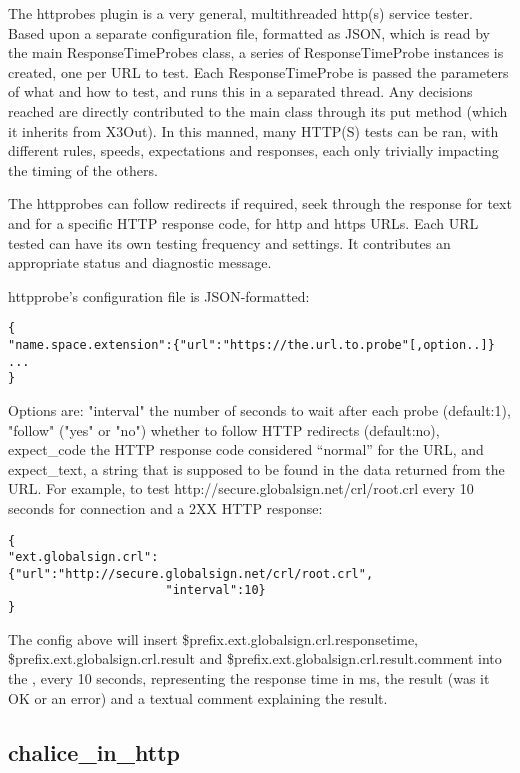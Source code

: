 The httprobes plugin is a very general, multithreaded http(s)
service tester.  Based upon a separate configuration file, formatted
as JSON, which is read by the main ResponseTimeProbes class, a series
of ResponseTimeProbe instances is created, one per URL to test. Each
ResponseTimeProbe is passed the parameters of what and how to test,
and runs this in a separated thread.  Any decisions reached are directly
contributed to the main class through its put method (which it inherits
from X3Out). In this manned, many HTTP(S) tests can be ran, with different
rules, speeds, expectations and responses, each only trivially impacting
the timing of the others.

The httpprobes can follow redirects if required, seek through the response
for text and for a specific HTTP response code, for http and https
URLs. Each URL tested can have its own testing frequency and settings.
It contributes an appropriate status and diagnostic message.

httpprobe's configuration file is JSON-formatted:

\begin{verbatim}
{
"name.space.extension":{"url":"https://the.url.to.probe"[,option..]}
...
}
\end{verbatim}

Options are: "interval" the number of seconds to wait after each probe
(default:1), "follow" ("yes" or "no") whether to follow HTTP redirects (default:no),
expect\_code the HTTP response code considered ``normal'' for the URL,
and expect\_text, a string that is supposed to be found in the data returned
from the URL. For example, to test http://secure.globalsign.net/crl/root.crl
every 10 seconds for connection and a 2XX HTTP response:

\begin{verbatim}
{
"ext.globalsign.crl":{"url":"http://secure.globalsign.net/crl/root.crl",
                      "interval":10}
}
\end{verbatim}

The config above will insert \$prefix.ext.globalsign.crl.responsetime,
\$prefix.ext.globalsign.crl.result and \$prefix.ext.globalsign.crl.result.comment
into the \coven{}, every 10 seconds, representing the response time in ms,
the result (was it OK or an error) and a textual comment explaining the
result.

\subsection{chalice\_in\_http}

